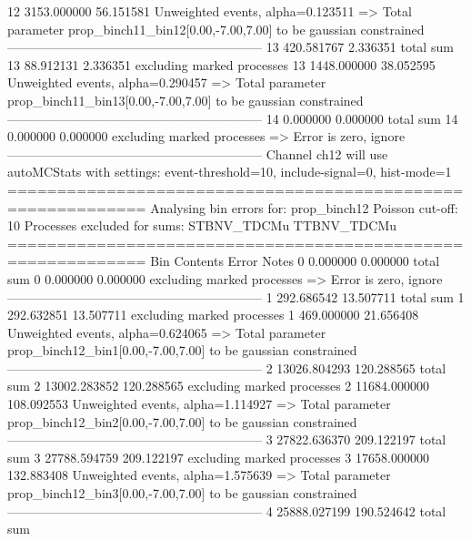 12         3153.000000     56.151581       Unweighted events, alpha=0.123511
  => Total parameter prop_binch11_bin12[0.00,-7.00,7.00] to be gaussian constrained
------------------------------------------------------------
13         420.581767      2.336351        total sum                     
13         88.912131       2.336351        excluding marked processes    
13         1448.000000     38.052595       Unweighted events, alpha=0.290457
  => Total parameter prop_binch11_bin13[0.00,-7.00,7.00] to be gaussian constrained
------------------------------------------------------------
14         0.000000        0.000000        total sum                     
14         0.000000        0.000000        excluding marked processes    
  => Error is zero, ignore      
------------------------------------------------------------
Channel ch12 will use autoMCStats with settings: event-threshold=10, include-signal=0, hist-mode=1
============================================================
Analysing bin errors for: prop_binch12
Poisson cut-off: 10
Processes excluded for sums: STBNV_TDCMu TTBNV_TDCMu
============================================================
Bin        Contents        Error           Notes                         
0          0.000000        0.000000        total sum                     
0          0.000000        0.000000        excluding marked processes    
  => Error is zero, ignore      
------------------------------------------------------------
1          292.686542      13.507711       total sum                     
1          292.632851      13.507711       excluding marked processes    
1          469.000000      21.656408       Unweighted events, alpha=0.624065
  => Total parameter prop_binch12_bin1[0.00,-7.00,7.00] to be gaussian constrained
------------------------------------------------------------
2          13026.804293    120.288565      total sum                     
2          13002.283852    120.288565      excluding marked processes    
2          11684.000000    108.092553      Unweighted events, alpha=1.114927
  => Total parameter prop_binch12_bin2[0.00,-7.00,7.00] to be gaussian constrained
------------------------------------------------------------
3          27822.636370    209.122197      total sum                     
3          27788.594759    209.122197      excluding marked processes    
3          17658.000000    132.883408      Unweighted events, alpha=1.575639
  => Total parameter prop_binch12_bin3[0.00,-7.00,7.00] to be gaussian constrained
------------------------------------------------------------
4          25888.027199    190.524642      total sum                     

